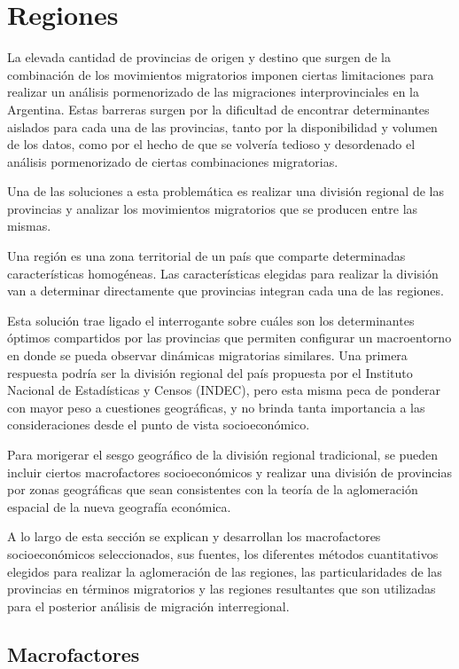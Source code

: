 \documentclass[12pt,a4paper]{article}
\begin{document}
\newpage
\section{Regiones}

La elevada cantidad de provincias de origen y destino que surgen de la combinación de los movimientos migratorios imponen  ciertas limitaciones para realizar un análisis pormenorizado de las migraciones interprovinciales en la Argentina. Estas barreras surgen por la dificultad de encontrar determinantes aislados para cada una de las provincias, tanto por la disponibilidad y volumen de los datos, como por el hecho de que se volvería tedioso y desordenado el análisis pormenorizado de ciertas combinaciones migratorias.

Una de las soluciones a esta problemática es realizar una división regional de las provincias y analizar los movimientos migratorios que se producen entre las mismas.

Una región es una zona territorial de un país que comparte determinadas características homogéneas. Las características elegidas para realizar la división van a determinar directamente que provincias integran cada una de las regiones.

Esta solución trae ligado el interrogante sobre cuáles son los determinantes óptimos compartidos por las provincias que permiten configurar un macroentorno en donde se pueda observar dinámicas migratorias similares. Una primera respuesta podría ser la división regional del país propuesta por el Instituto Nacional de Estadísticas y Censos (INDEC), pero esta misma peca de ponderar con mayor peso a cuestiones geográficas, y no brinda tanta importancia a las consideraciones desde el punto de vista socioeconómico.

Para morigerar el sesgo geográfico de la división regional tradicional, se pueden incluir ciertos macrofactores socioeconómicos y realizar una división  de provincias por zonas geográficas que  sean consistentes con la teoría de la aglomeración espacial de la nueva geografía económica.

A lo largo de esta sección se explican y desarrollan los macrofactores socioeconómicos seleccionados, sus fuentes, los diferentes métodos cuantitativos elegidos para realizar la aglomeración de las regiones, las particularidades de las provincias en términos migratorios y las regiones resultantes que son utilizadas para el posterior análisis de migración interregional. 

\subsection{Macrofactores}
\end{document}
